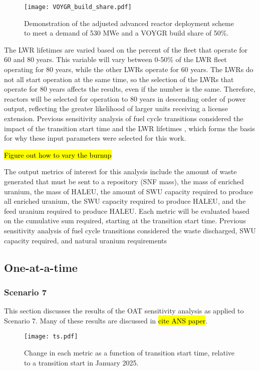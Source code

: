 \begin{figure}
    \centering 
    \texttt{[image: VOYGR\_build\_share.pdf]}
    \caption{Demonstration of the adjusted advanced reactor deployment 
    scheme to meet a demand of 530 MWe and a VOYGR build share of 
    50\%.}
    \label{fig:build-share-deploy}
\end{figure}

The \gls{LWR} lifetimes are varied based 
on the percent of the fleet that operate for 60 and 80 years. This 
variable will vary between 0-50\% of the \gls{LWR} fleet operating for 80 
years, while the other \glspl{LWR} operate for 60 years. The 
\glspl{LWR} do not all start operation at the same time, so the 
selection of the \glspl{LWR} that operate for 80 years affects the results, 
even if the number is the same. Therefore, reactors will be selected for 
operation to 80 years in 
descending order of power output, reflecting the greater likelihood of 
larger units receiving a license extension. Previous sensitivity analysis of 
fuel cycle transitions considered the impact of the transition start time 
and the \gls{LWR} lifetimes \cite{chee_sensitivity_2019,feng_sensitivity_2020},
which forms the basis for why these input parameters were selected for this 
work.

\hl{Figure out how to vary the burnup}

The output metrics of 
interest for this analysis include the amount of waste generated that 
must be sent to a repository (\gls{SNF} mass), the mass of enriched uranium, 
the mass of \gls{HALEU},
the amount of \gls{SWU} capacity required to produce all enriched uranium, the 
\gls{SWU} capacity required to produce \gls{HALEU}, and the feed uranium 
required to produce \gls{HALEU}. Each metric will be evaluated based on the 
cumulative sum required, starting at the transition start time. Previous 
sensitivity analysis of fuel cycle transitions considered the waste 
discharged, \gls{SWU} 
capacity required, and natural uranium requirements
\cite{richards_application_2021,feng_sensitivity_2020} 


\subsection{One-at-a-time}
\subsubsection{Scenario 7}
This section discusses the results of the \gls{OAT} sensitivity analysis 
as applied to Scenario 7. Many of these results are discussed in 
\hl{cite ANS paper}. 
\begin{figure}
    \centering
    \texttt{[image: ts.pdf]}
    \caption{Change in each metric as a function of transition start 
    time, relative to a transition start in January 2025.}
    \label{fig:ts_scenario7}
\end{figure}

